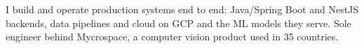 
\begin{cvparagraph}
I build and operate production systems end to end: Java/Spring Boot and NestJS backends, data pipelines and cloud on GCP and the ML models they serve. Sole engineer behind Mycrospace, a computer vision product used in 35 countries.
\end{cvparagraph}
